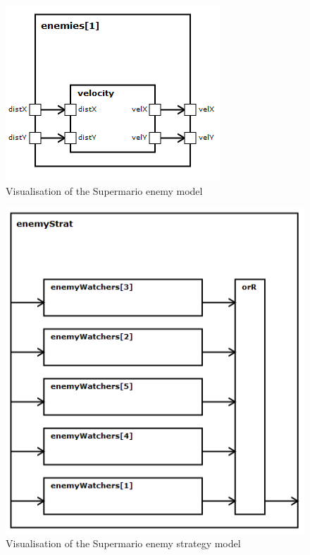 \begin{figure}
	\centering
	\includegraphics[scale=0.3]{pictures/haller_enemy.PNG}
	\caption{Visualisation of the Supermario enemy model}
	\label{fig:marioEnemy}
\end{figure}

\begin{figure}
	\centering
	\includegraphics[scale=0.3]{pictures/haller_enemystrategy.PNG}
	\caption{Visualisation of the Supermario enemy strategy model}
	\label{fig:marioEnemyStrategy}
\end{figure}